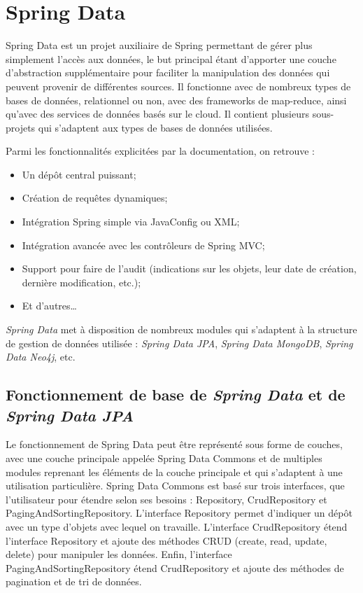 \documentclass{polytech/polytech}
\begin{document}
\chapter{Spring Data}


Spring Data est un projet auxiliaire de Spring permettant de gérer plus simplement l’accès aux données, le but principal étant d’apporter une couche d’abstraction supplémentaire pour faciliter la manipulation des données qui peuvent provenir de différentes sources. Il fonctionne avec de nombreux types de bases de données, relationnel ou non, avec des frameworks de map-reduce, ainsi qu’avec des services de données basés sur le cloud. Il contient plusieurs sous-projets qui s’adaptent aux types de bases de données utilisées. 

Parmi les fonctionnalités explicitées par la documentation, on retrouve :

\begin{itemize}
	\item Un dépôt central puissant;
	\item Création de requêtes dynamiques; 
	\item Intégration Spring simple via JavaConfig ou XML;
	\item Intégration avancée avec les contrôleurs de Spring MVC;
	\item Support pour faire de l’audit (indications sur les objets, leur date de création, dernière modification, etc.);
	\item Et d’autres…
\end{itemize}

\textit{Spring Data} met à disposition de nombreux modules qui s’adaptent à la structure de gestion de données utilisée : \textit{Spring Data JPA}, \textit{Spring Data MongoDB}, \textit{Spring Data Neo4j}, etc.

\section{Fonctionnement de base de \textit{Spring Data} et de \textit{Spring Data JPA}}

Le fonctionnement de Spring Data peut être représenté sous forme de couches, avec une couche principale appelée Spring Data Commons et de multiples modules reprenant les éléments de la couche principale et qui s’adaptent à une utilisation particulière. Spring Data Commons est basé sur trois interfaces, que l’utilisateur pour étendre selon ses besoins : Repository, CrudRepository et PagingAndSortingRepository. L’interface Repository permet d’indiquer un dépôt avec un type d’objets avec lequel on travaille. L’interface CrudRepository étend l’interface Repository et ajoute des méthodes CRUD (create, read, update, delete) pour manipuler les données. Enfin, l’interface PagingAndSortingRepository étend CrudRepository et ajoute des méthodes de pagination et de tri de données.
\end{document}
